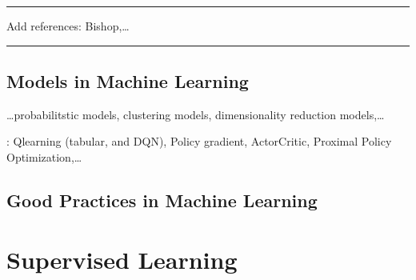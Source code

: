 \documentclass[letterpaper,10pt,english]{jupyterBook}
\begin{document}
\sphinxAtStartPar
{} 






\bigskip\hrule\bigskip


\sphinxAtStartPar
{} Add references: Bishop,…


\bigskip\hrule\bigskip


\sphinxstepscope


\section{Models in Machine Learning}
\label{\detokenize{ch/ml/models:models-in-machine-learning}}\label{\detokenize{ch/ml/models:ml-models}}\label{\detokenize{ch/ml/models::doc}}
\sphinxAtStartPar
{}

\sphinxAtStartPar
{}

\sphinxAtStartPar
{}

\sphinxAtStartPar
{}

\sphinxAtStartPar
…probabilitstic models, clustering models, dimensionality reduction models,…

\sphinxAtStartPar
{}: Q\sphinxhyphen{}learning (tabular, and DQN), Policy gradient, Actor\sphinxhyphen{}Critic, Proximal Policy Optimization,…

\sphinxstepscope


\section{Good Practices in Machine Learning}
\label{\detokenize{ch/ml/good-practice:good-practices-in-machine-learning}}\label{\detokenize{ch/ml/good-practice:ml-good-practices}}\label{\detokenize{ch/ml/good-practice::doc}}
\sphinxstepscope


\chapter{Supervised Learning}
\label{\detokenize{ch/ml/sl:supervised-learning}}\label{\detokenize{ch/ml/sl:ml-sl}}\label{\detokenize{ch/ml/sl::doc}}
\sphinxAtStartPar
{}
\end{document}

